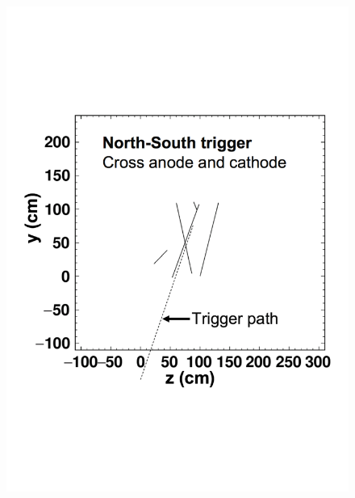 \begin{figure}[h!]
  \centering
  \begin{minipage}{0.45\textwidth}
    \centering
    \includegraphics[width=\textwidth]{North-South}
  \end{minipage}
  \begin{minipage}{0.45\textwidth}
    \centering

\end{minipage}
\end{figure}
